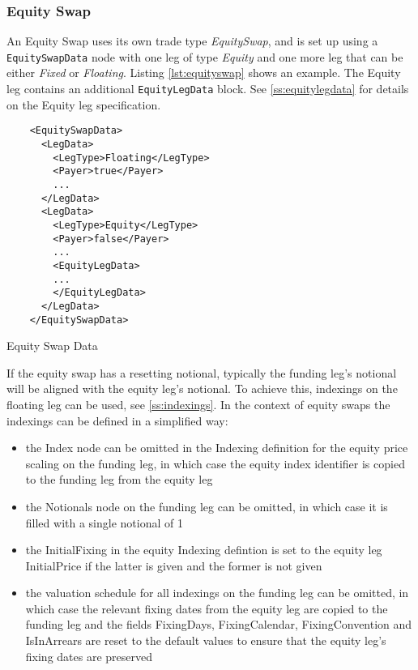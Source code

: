 \subsubsection{Equity Swap}
\label{ss:equity_swap}

An Equity Swap uses its own trade type  \emph{EquitySwap}, and is set up using a {\tt EquitySwapData} node with one leg of type  \emph{Equity} and one more leg that can be either \emph{Fixed} or  \emph{Floating}. Listing \ref{lst:equityswap} shows an example. The
Equity leg contains an additional {\tt EquityLegData} block. See \ref{ss:equitylegdata} for details on the Equity leg specification.

\begin{listing}[H]
\begin{verbatim}
    <EquitySwapData>
      <LegData>
        <LegType>Floating</LegType>
        <Payer>true</Payer>
        ...
      </LegData>
      <LegData>
        <LegType>Equity</LegType>
        <Payer>false</Payer>
        ...
        <EquityLegData>
        ...
        </EquityLegData>
      </LegData>
    </EquitySwapData>
\end{verbatim}
\caption{Equity Swap Data}
\label{lst:equityswap}
\end{listing}

If the equity swap has a resetting notional, typically the funding leg's notional will be aligned with the equity leg's
notional. To achieve this, indexings on the floating leg can be used, see \ref{ss:indexings}. In the context of equity
swaps the indexings can be defined in a simplified way:

\begin{itemize}
\item the Index node can be omitted in the Indexing definition for the equity price scaling on the funding leg, in which
  case the equity index identifier is copied to the funding leg from the equity leg
\item the Notionals node on the funding leg can be omitted, in which case it is filled with a single notional of 1
\item the InitialFixing in the equity Indexing defintion is set to the equity leg InitialPrice if the latter is given
  and the former is not given
\item the valuation schedule for all indexings on the funding leg can be omitted, in which case the relevant fixing
  dates from the equity leg are copied to the funding leg and the fields FixingDays, FixingCalendar, FixingConvention
  and IsInArrears are reset to the default values to ensure that the equity leg's fixing dates are preserved
\end{itemize}

